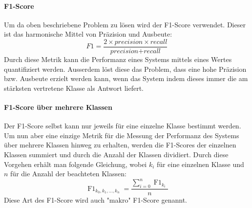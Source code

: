 \paragraph{F1-Score} Um da oben beschriebene Problem zu lösen wird der F1-Score verwendet. Dieser ist das harmonische Mittel von Präzision und Ausbeute:
\begin{equation}
\label{basic:metrics:f1_eq}
F1 = \frac{2 \times \textit{precision} \times recall}{\textit{precision} + \textit{recall}}
\end{equation}
Durch diese Metrik kann die Performanz eines Systems mittels eines Wertes quantifiziert werden. Ausserdem löst diese das Problem, dass eine hohe Präzision bzw. Ausbeute erzielt werden kann, wenn das System  indem dieses immer die am stärksten vertretene Klasse als Antwort liefert.
\paragraph{F1-Score über mehrere Klassen} Der F1-Score selbst kann nur jeweils für eine einzelne Klasse bestimmt werden. Um nun aber eine einzige Metrik für die Messung der Performanz des Systems über mehrere Klassen hinweg zu erhalten, werden die F1-Scores der einzelnen Klassen summiert und durch die Anzahl der Klassen dividiert. Durch diese Vorgehen erhält man folgende Gleichung, wobei $k_i$ für eine einzelnen Klasse und $n$ für die Anzahl der beachteten Klassen:
\begin{equation}
\operatorname{F1}_{k_0, k_1, \dots, k_n} = \frac{\sum_{i=0}^{n} \operatorname{F1}_{k_i}}{n}
\end{equation}
Diese Art des F1-Score wird auch "makro" F1-Score genannt.




